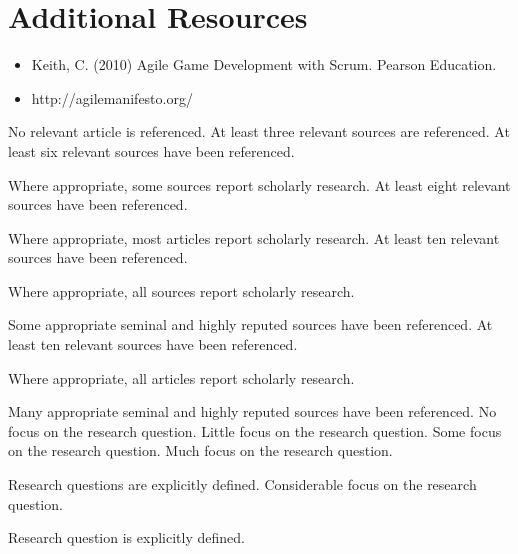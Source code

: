 \documentclass{../fal_assignment}
\begin{document}
\section*{Additional Resources}

\begin{itemize}
    \item Keith, C. (2010) Agile Game Development with Scrum. Pearson Education.
    \item http://agilemanifesto.org/
\end{itemize}

\begin{markingrubric}
%
%
        \grade\fail 	No relevant article is referenced.
        \grade 		At least three relevant sources are referenced.
        \grade 		At least six relevant sources have been referenced.
        \par		Where appropriate, some sources report scholarly research.
        \grade 		At least eight relevant sources have been referenced.
        \par		Where appropriate, most articles report scholarly research.
        \grade 		At least ten relevant sources have been referenced.
        \par		Where appropriate, all sources report scholarly research.
        \par		Some appropriate seminal and highly reputed sources have been referenced.      
        \grade 		At least ten relevant sources have been referenced.
        \par		Where appropriate, all articles report scholarly research.
        \par		Many appropriate seminal and highly reputed sources have been referenced.   
%
        \grade\fail 	No focus on the research question.
        \grade 		Little focus on the research question.
        \grade 		Some focus on the research question.
        \grade 		Much focus on the research question.
            \par 		Research questions are explicitly defined.
        \grade 		Considerable focus on the research question.
            \par 		Research question is explicitly defined.

\end{markingrubric}
\end{document}
